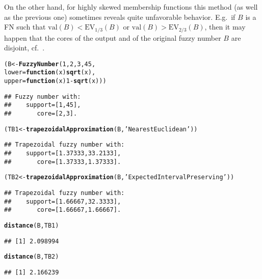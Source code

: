 \documentclass[11pt]{article}\usepackage[]{graphicx}\usepackage[]{color}
\makeatletter
\newcommand{\hlnum}[1]{\textcolor[rgb]{0.686,0.059,0.569}{#1}}%
\newcommand{\hlstr}[1]{\textcolor[rgb]{0.192,0.494,0.8}{#1}}%
\newcommand{\hlopt}[1]{\textcolor[rgb]{0,0,0}{#1}}%
\newcommand{\hlstd}[1]{\textcolor[rgb]{0.345,0.345,0.345}{#1}}%
\newcommand{\hlkwa}[1]{\textcolor[rgb]{0.161,0.373,0.58}{\textbf{#1}}}%
\newcommand{\hlkwb}[1]{\textcolor[rgb]{0.69,0.353,0.396}{#1}}%
\newcommand{\hlkwc}[1]{\textcolor[rgb]{0.333,0.667,0.333}{#1}}%
\newcommand{\hlkwd}[1]{\textcolor[rgb]{0.737,0.353,0.396}{\textbf{#1}}}%
\newenvironment{kframe}{%
 \def\at@end@of@kframe{}%
 \ifinner\ifhmode%
  \def\at@end@of@kframe{\end{minipage}}%
  \begin{minipage}{\columnwidth}%
 \fi\fi%
 \def\FrameCommand##1{\hskip\@totalleftmargin \hskip-\fboxsep
 \colorbox{shadecolor}{##1}\hskip-\fboxsep
     \hskip-\linewidth \hskip-\@totalleftmargin \hskip\columnwidth}%
 \MakeFramed {\advance\hsize-\width
   \@totalleftmargin\z@ \linewidth\hsize
   \@setminipage}}%
 {\par\unskip\endMakeFramed%
 \at@end@of@kframe}
\newenvironment{knitrout}{}{} %
\makeatother
\begin{document}


On the other hand, for highly skewed membership functions this method
(as well as the previous one)  sometimes reveals quite unfavorable
behavior. E.g.~if $B$ is a FN such that
$\mathrm{val}(B) < \mathrm{EV}_{1/3}(B)$
or $\mathrm{val}(B) > \mathrm{EV}_{2/3}(B)$,
then it may happen that the cores of the output
and of the original fuzzy number $B$ are disjoint,
cf.~\cite{GrzegorzewskiPasternak2011:trapapproxsupcore}.

\begin{knitrout}\small
{}\color{fgcolor}\begin{kframe}
\begin{alltt}
\hlstd{(B}  \hlkwb{<-} \hlkwd{FuzzyNumber}\hlstd{(}\hlnum{1}\hlstd{,} \hlnum{2}\hlstd{,} \hlnum{3}\hlstd{,} \hlnum{45}\hlstd{,}
   \hlkwc{lower}\hlstd{=}\hlkwa{function}\hlstd{(}\hlkwc{x}\hlstd{)} \hlkwd{sqrt}\hlstd{(x),}
   \hlkwc{upper}\hlstd{=}\hlkwa{function}\hlstd{(}\hlkwc{x}\hlstd{)} \hlnum{1}\hlopt{-}\hlkwd{sqrt}\hlstd{(x)))}
\end{alltt}
\begin{verbatim}
## Fuzzy number with:
##    support=[1,45],
##       core=[2,3].
\end{verbatim}
\begin{alltt}
\hlstd{(TB1} \hlkwb{<-} \hlkwd{trapezoidalApproximation}\hlstd{(B,} \hlstr{'NearestEuclidean'}\hlstd{))}
\end{alltt}
\begin{verbatim}
## Trapezoidal fuzzy number with:
##    support=[1.37333,33.2133],
##       core=[1.37333,1.37333].
\end{verbatim}
\begin{alltt}
\hlstd{(TB2} \hlkwb{<-} \hlkwd{trapezoidalApproximation}\hlstd{(B,} \hlstr{'ExpectedIntervalPreserving'}\hlstd{))}
\end{alltt}
\begin{verbatim}
## Trapezoidal fuzzy number with:
##    support=[1.66667,32.3333],
##       core=[1.66667,1.66667].
\end{verbatim}
\begin{alltt}
\hlkwd{distance}\hlstd{(B, TB1)}
\end{alltt}
\begin{verbatim}
## [1] 2.098994
\end{verbatim}
\begin{alltt}
\hlkwd{distance}\hlstd{(B, TB2)}
\end{alltt}
\begin{verbatim}
## [1] 2.166239
\end{verbatim}
\end{kframe}
\end{knitrout}
\end{document}
